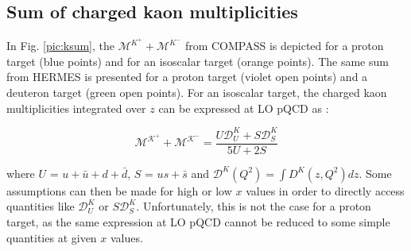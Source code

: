 \subsection{Sum of charged kaon multiplicities}

In Fig. \ref{pic:ksum}, the $\mathscr{M}^{K^+}+\mathscr{M}^{K^-}$ from COMPASS is depicted for a proton target (blue points) and for an isoscalar target (orange points). The same sum from HERMES is presented for a proton target (violet open points) and a deuteron target (green open points). For an isoscalar target, the charged kaon multiplicities integrated over $z$ can be expressed at LO pQCD as :

\begin{equation}
  \mathscr{M^{K^+}}+\mathscr{M^{K^-}} = \frac{U\mathscr{D}^K_U+S\mathscr{D}^K_S}{5U+2S}
\end{equation}

where $U$ = $u+\bar{u}+d+\bar{d}$, $S$ = $us+\bar{s}$ and $\mathscr{D}^K(Q^2) = \int D^K(z,Q^2) dz $. Some assumptions can then be made for high or low $x$ values in order to directly access quantities like $\mathscr{D}^K_U$ or $S\mathscr{D}^K_S$. Unfortunately, this is not the case for a proton target, as the same expression at LO pQCD cannot be reduced to some simple quantities at given $x$ values.

